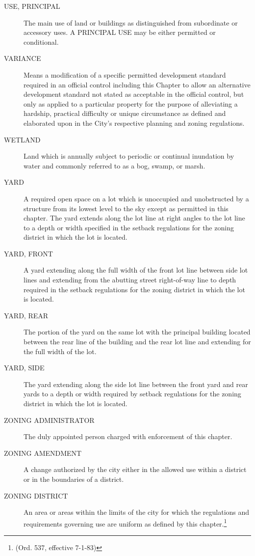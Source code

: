\begin{description}
    \item[USE, PRINCIPAL] The main use of land or buildings as distinguished from subordinate or accessory uses.  A PRINCIPAL USE may be either permitted or conditional.
    \item[VARIANCE] Means a modification of a specific permitted development standard required in an official control including this Chapter to allow an alternative development standard not stated as acceptable in the official control, but only as applied to a particular property for the purpose of alleviating a hardship, practical difficulty or unique circumstance as defined and elaborated upon in the City's respective planning and zoning regulations.
    \item[WETLAND] Land which is annually subject to periodic or continual inundation by water and commonly referred to as a bog, swamp, or marsh.
    \item[YARD] A required open space on a lot which is unoccupied and unobstructed by a structure from its lowest level to the sky except as permitted in this chapter. The yard extends along the lot line at right angles to the lot line to a depth or width specified in the setback regulations for the zoning district in which the lot is located.
    \item[YARD, FRONT] A yard extending along the full width of the front lot line between side lot lines and extending from the abutting street right-of-way line to depth required in the setback regulations for the zoning district in which the lot is located.
    \item[YARD, REAR] The portion of the yard on the same lot with the principal building located between the rear line of the building and the rear lot line and extending for the full width of the lot.
    \item[YARD, SIDE] The yard extending along the side lot line between the front yard and rear yards to a depth or width required by setback regulations for the zoning district in which the lot is located.
    \item[ZONING ADMINISTRATOR] The duly appointed person charged with enforcement of this chapter.
    \item[ZONING AMENDMENT] A change authorized by the city either in the allowed use within a district or in the boundaries of a district.
    \item[ZONING DISTRICT] An area or areas within the limits of the city for which the regulations and requirements governing use are uniform as defined by this chapter.\footnote{(Ord. 537, effective 7-1-83)}
\end{description}
